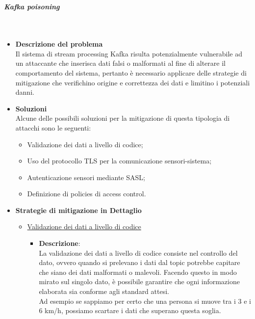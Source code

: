 \documentclass[10pt]{article}
\newcommand{\mysubparagraph}[1]{\subparagraph{#1}\mbox{}\\}
\begin{document}
        \mysubparagraph{Kafka poisoning}
        \begin{itemize}
            \item \textbf{Descrizione del problema}\\
            Il sistema di stream processing Kafka risulta potenzialmente vulnerabile ad un attaccante che inserisca
            dati falsi o malformati al fine di alterare il comportamento del sistema, pertanto è necessario applicare delle strategie
            di mitigazione che verifichino origine e correttezza dei dati e limitino i potenziali danni.
            
            \item \textbf{Soluzioni}\\
            Alcune delle possibili soluzioni per la mitigazione di questa tipologia di attacchi sono le seguenti:
            \begin{itemize}
                \item Validazione dei dati a livello di codice; 
                \item Uso del protocollo TLS per la comunicazione sensori-sistema;
                \item Autenticazione sensori mediante SASL;
                \item Definizione di policies di access control.
            \end{itemize}
            
            \item \textbf{Strategie di mitigazione in Dettaglio}
            \begin{itemize}
            
                \item \underline{Validazione dei dati a livello di codice}
                \begin{itemize}
                    \item \textbf{Descrizione}:\\
                    La validazione dei dati a livello di codice consiste nel controllo del dato, ovvero quando si prelevano i dati dal topic potrebbe capitare che siano dei dati malformati o malevoli. 
                    Facendo questo in modo mirato sul singolo dato, è possibile garantire che ogni informazione elaborata sia conforme agli standard attesi. \\
                    Ad esempio se sappiamo per certo che una persona si muove tra i 3 e i 6 km/h, possiamo scartare i dati che superano questa soglia.


\end{itemize}
\end{itemize}
\end{itemize}
\end{document}
